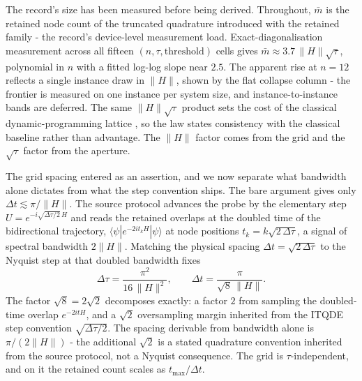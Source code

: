 The record's size has been measured before being derived. Throughout, $\bar m$ is the retained node count of the truncated quadrature introduced with the retained family - the record's device-level measurement load. Exact-diagonalisation measurement across all fifteen $(n, \tau, \mathrm{threshold})$ cells gives $\bar m \approx 3.7\,\|H\|\sqrt{\tau}$, polynomial in $n$ with a fitted log-log slope near $2.5$. The apparent rise at $n = 12$ reflects a single instance draw in $\|H\|$, shown by the flat collapse column - the frontier is measured on one instance per system size, and instance-to-instance bands are deferred. The same $\|H\|\sqrt{\tau}$ product sets the cost of the classical dynamic-programming lattice \cite{bellman1957dp}, so the law states consistency with the classical baseline rather than advantage. The $\|H\|$ factor comes from the grid and the $\sqrt{\tau}$ factor from the aperture.

The grid spacing entered as an assertion, and we now separate what bandwidth alone dictates from what the step convention ships. The bare argument gives only $\Delta t \lesssim \pi/\|H\|$. The source protocol advances the probe by the elementary step $U = e^{-i\sqrt{\Delta\tau/2}\,H}$ and reads the retained overlaps at the doubled time of the bidirectional trajectory, $\langle\psi|e^{-2it_kH}|\psi\rangle$ at node positions $t_k = k\sqrt{2\,\Delta\tau}$, a signal of spectral bandwidth $2\|H\|$. Matching the physical spacing $\Delta t = \sqrt{2\,\Delta\tau}$ to the Nyquist step at that doubled bandwidth fixes
\begin{equation}\label{res:bandwidth-grid}
\Delta\tau = \frac{\pi^2}{16\,\|H\|^2},
\qquad
\Delta t = \frac{\pi}{\sqrt{8}\,\|H\|} .
\end{equation}
The factor $\sqrt{8} = 2\sqrt{2}$ decomposes exactly: a factor $2$ from sampling the doubled-time overlap $e^{-2itH}$, and a $\sqrt{2}$ oversampling margin inherited from the ITQDE step convention $\sqrt{\Delta\tau/2}$. The spacing derivable from bandwidth alone is $\pi/(2\|H\|)$ - the additional $\sqrt{2}$ is a stated quadrature convention inherited from the source protocol, not a Nyquist consequence. The grid is $\tau$-independent, and on it the retained count scales as $t_{\max}/\Delta t$.

